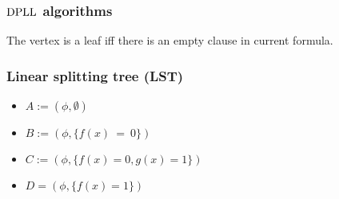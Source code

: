 \begin{frame}
	\frametitle{$\mathrm{DPLL}$ algorithms}

   	
    
	\pause
    \pause
    \pause
    \pause
    \pause

    The vertex is a leaf iff there is an empty clause in current formula.

\end{frame}


\begin{frame}
	\frametitle{Linear splitting tree (LST)}

   	

    \vspace{1cm}
    
    \begin{minipage}{0.42\linewidth}
        \begin{itemize}
            \item<1-> $A := (\phi, \emptyset)$
	    	\item<2-> $B := (\phi, \{f(x)~=~0\})$
        \end{itemize}
    \end{minipage}
    \begin{minipage}{0.55\linewidth}
        \begin{itemize}
            \item<4-> $C := (\phi, \{f(x) = 0, g(x) = 1\})$
        	\item<5-> $D = (\phi, \{f(x) = 1\})$
        \end{itemize}
    \end{minipage}
    
	\pause
    \pause
    \pause
    \pause

\end{frame}


